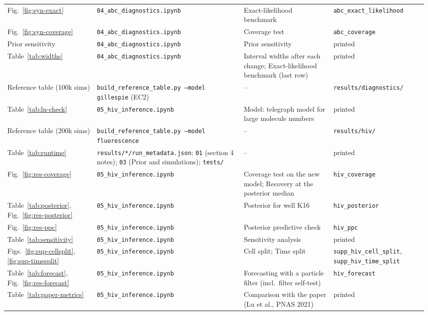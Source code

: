\begin{table}[htbp]
\begin{tabular}{p{3.0cm}p{4.3cm}p{4.3cm}p{3.7cm}}
Fig.~\ref{fig:syn-exact} & \texttt{04\_abc\_diagnostics.ipynb} & Exact-likelihood benchmark & \texttt{abc\_exact\_likelihood} \\
Fig.~\ref{fig:syn-coverage} & \texttt{04\_abc\_diagnostics.ipynb} & Coverage test & \texttt{abc\_coverage} \\
Prior sensitivity & \texttt{04\_abc\_diagnostics.ipynb} & Prior sensitivity & printed \\
Table~\ref{tab:widths} & \texttt{04\_abc\_diagnostics.ipynb} & Interval widths after each change; Exact-likelihood benchmark (last row) & printed \\
Reference table (100k sims) & \texttt{build\_reference\_table.py --model gillespie} (EC2) & -- & \texttt{results/diagnostics/} \\
\midrule
Table~\ref{tab:ln-check} & \texttt{05\_hiv\_inference.ipynb} & Model: telegraph model for large molecule numbers & printed \\
Reference table (200k sims) & \texttt{build\_reference\_table.py --model fluorescence} & -- & \texttt{results/hiv/} \\
Table~\ref{tab:runtime} & \texttt{results/*/run\_metadata.json}; \texttt{01} (section 4 notes); \texttt{03} (Prior and simulations); \texttt{tests/} & -- & printed \\
Fig.~\ref{fig:res-coverage} & \texttt{05\_hiv\_inference.ipynb} & Coverage test on the new model; Recovery at the posterior median & \texttt{hiv\_coverage} \\
Table~\ref{tab:posterior}, Fig.~\ref{fig:res-posterior} & \texttt{05\_hiv\_inference.ipynb} & Posterior for well K16 & \texttt{hiv\_posterior} \\
Fig.~\ref{fig:res-ppc} & \texttt{05\_hiv\_inference.ipynb} & Posterior predictive check & \texttt{hiv\_ppc} \\
Table~\ref{tab:sensitivity} & \texttt{05\_hiv\_inference.ipynb} & Sensitivity analysis & printed \\
Figs.~\ref{fig:sup-cellsplit}, \ref{fig:sup-timesplit} & \texttt{05\_hiv\_inference.ipynb} & Cell split; Time split & \texttt{supp\_hiv\_cell\_split}, \texttt{supp\_hiv\_time\_split} \\
Table~\ref{tab:forecast}, Fig.~\ref{fig:res-forecast} & \texttt{05\_hiv\_inference.ipynb} & Forecasting with a particle filter (incl.\ filter self-test) & \texttt{hiv\_forecast} \\
Table~\ref{tab:paper-metrics} & \texttt{05\_hiv\_inference.ipynb} & Comparison with the paper (Lu et al., PNAS 2021) & printed \\

\end{tabular}
\end{table}
